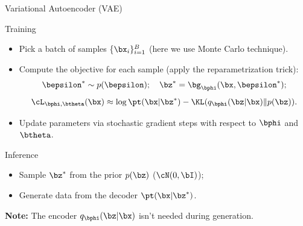 \documentclass{beamer}
\begin{document}
\begin{frame}{Variational Autoencoder (VAE)}
	\begin{block}{Training}
		\begin{itemize}
			\item Pick a batch of samples \{$\bx_i\}_{i=1}^B$ (here we use Monte Carlo technique).
			\eqpause
			\item Compute the objective for each sample (apply the reparametrization trick):
			\vspace{-0.3cm}
			\[
				\bepsilon^* \sim p(\bepsilon); \quad \bz^* = \bg_{\bphi}(\bx, \bepsilon^*);
			\]
			\[
				\cL_{\bphi, \btheta}(\bx) \approx  \log \pt(\bx | \bz^*) - \KL(q_{\bphi}(\bz| \bx) \| p(\bz)).
			\]
			\eqpause
			\vspace{-0.5cm}
			\item Update parameters via stochastic gradient steps with respect to $\bphi$ and $\btheta$.
		\end{itemize}
	\end{block}
	\eqpause
	\begin{block}{Inference}
		\begin{itemize}
			\item Sample $\bz^*$ from the prior $p(\bz)$ ($\cN(0, \bI)$);
			\eqpause
			\item Generate data from the decoder $\pt(\bx | \bz^*)$.
		\end{itemize}
	\end{block}
	\eqpause
	\textbf{Note:} The encoder $q_{\bphi}(\bz| \bx)$ isn't needed during generation.
\end{frame}
\end{document}
